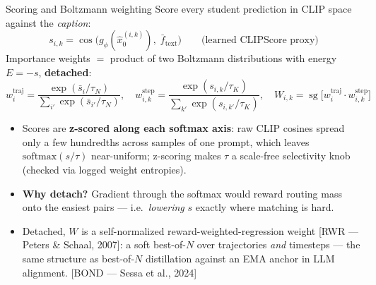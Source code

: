 \documentclass[aspectratio=169,10pt]{beamer}
\newcommand{\sg}{\operatorname{sg}}
\newcommand{\cossim}{\operatorname{cos}}
\newcommand{\xhat}{\hat{x}_0}
\newcommand{\ftext}{\bar{f}_{\mathrm{text}}}
\newcommand{\litref}[1]{{\scriptsize\color{black!55}[#1]}}
\begin{document}
\begin{frame}{Scoring and Boltzmann weighting}
  Score every student prediction in CLIP space against the \emph{caption}:
  \[
    s_{i,k} = \cossim\big( g_\phi(\xhat^{(i,k)}),\; \ftext \big)
    \qquad \text{(learned CLIPScore proxy)}
  \]
  Importance weights $=$ product of two Boltzmann distributions with energy
  $E = -s$, \textbf{detached}:
  \[
    w^{\mathrm{traj}}_i = \frac{\exp(\bar{s}_i / \tau_N)}{\sum_{i'} \exp(\bar{s}_{i'} / \tau_N)},
    \quad
    w^{\mathrm{step}}_{i,k} = \frac{\exp(s_{i,k} / \tau_K)}{\sum_{k'} \exp(s_{i,k'} / \tau_K)},
    \quad
    W_{i,k} = \sg\big[ w^{\mathrm{traj}}_i \cdot w^{\mathrm{step}}_{i,k} \big]
  \]
  \begin{itemize}
    \item Scores are \textbf{z-scored along each softmax axis}: raw CLIP
      cosines spread only a few hundredths across samples of one prompt, which
      leaves $\mathrm{softmax}(s/\tau)$ near-uniform; z-scoring makes $\tau$ a
      scale-free selectivity knob (checked via logged weight entropies).
    \item \textbf{Why detach?} Gradient through the softmax would reward
      routing mass onto the easiest pairs --- i.e.\ \emph{lowering} $s$
      exactly where matching is hard.
    \item Detached, $W$ is a self-normalized reward-weighted-regression
      weight \litref{RWR --- Peters \& Schaal, 2007}: a \alert{soft
      best-of-$N$} over trajectories \emph{and} timesteps --- the same
      structure as best-of-$N$ distillation against an EMA anchor in LLM
      alignment. \litref{BOND --- Sessa et al., 2024}
  \end{itemize}
\end{frame}
\end{document}
